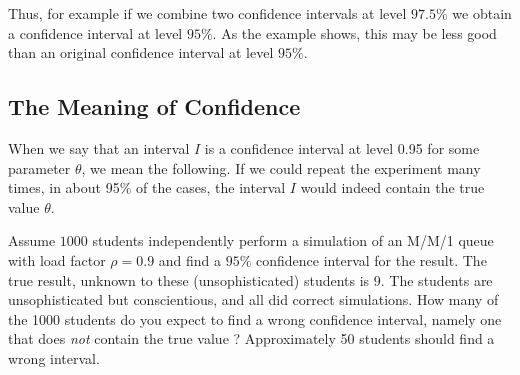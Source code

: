 Thus, for example if we combine two confidence intervals at
level $97.5\%$ we obtain a confidence interval at level $95\%$.
As the example shows, this may be less good than an original
confidence interval at level $95\%$.

\subsection{The Meaning of Confidence}
When we say that an interval $I$ is a confidence interval at
level 0.95 for some parameter $\theta$, we mean the following.
If we could repeat the experiment many times, in about 95\% of
the cases, the interval $I$ would indeed contain the true value
$\theta$.

 {Assume $1000$ students independently perform a simulation of an M/M/1 queue with
  load factor $\rho=0.9$ and find a $95\%$ confidence interval for the result. The true result,
  unknown to these (unsophisticated) students is $9$.
  The students are unsophisticated but conscientious, and all did correct simulations.
  How many of the 1000 students do you
  expect to find a wrong confidence interval, namely one that does \emph{not} contain the true value ?
 }
 {Approximately 50 students should find a wrong interval.
 }


%


